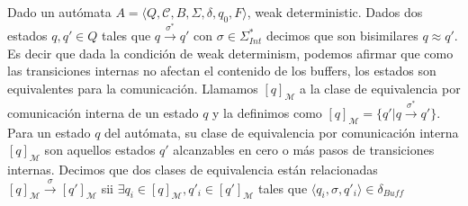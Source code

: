 \begin{definition}
Dado un autómata $A = \langle Q, \mathcal{C}, B, \Sigma, \delta, q_0, F \rangle$, weak deterministic. Dados dos estados $q, q' \in Q$ tales que $q \xrightarrow{\sigma^*} q'$ con $\sigma \in \Sigma_{\mathit{Int}}^*$ decimos que son bisimilares $q \approx q'$. Es decir que dada la condición de weak determinism, podemos afirmar que como las transiciones internas no afectan el contenido de los buffers, los estados son equivalentes para la comunicación. Llamamos $[q]_\mathcal{M}$ a la clase de equivalencia por comunicación interna de un estado $q$ y la definimos como $[q]_\mathcal{M}= \{q'| q \xrightarrow{\sigma^*} q'\}$. Para un estado $q$ del autómata, su clase de equivalencia por comunicación interna $[q]_\mathcal{M}$ son aquellos estados $q'$ alcanzables en cero o más pasos de transiciones internas. Decimos que dos clases de equivalencia están relacionadas $[q]_\mathcal{M} \xrightarrow{\sigma} [q']_\mathcal{M}$ sii $\exists q_i \in [q]_\mathcal{M}, q'_i \in [q']_\mathcal{M}$ tales que $\langle q_i,\sigma,q'_i \rangle \in \delta_{Buff}$
\end{definition}

